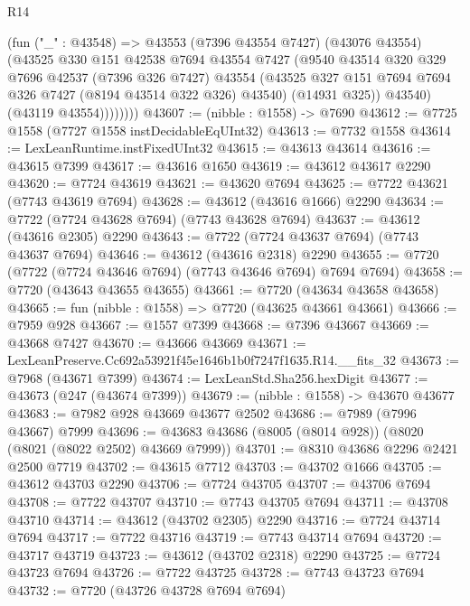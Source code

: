 \begin{lexlean}{R14}
\begin{coremodule}
                (fun ("_" : @43548) =>
                @43553
                  (@7396 @43554 @7427)
                  (@43076 @43554)
                  (@43525
                    @330
                    @151
                    @42538
                    @7694
                    @43554
                    @7427
                    (@9540
                      @43514
                      @320
                      @329
                      @7696
                      @42537
                      (@7396 @326 @7427)
                      @43554
                      (@43525 @327 @151 @7694 @7694 @326 @7427 (@8194 @43514 @322 @326) @43540)
                      (@14931 @325))
                    @43540)
                  (@43119 @43554))))))))
@43607 := (nibble : @1558) -> @7690
@43612 := @7725 @1558 (@7727 @1558 instDecidableEqUInt32)
@43613 := @7732 @1558
@43614 := LexLeanRuntime.instFixedUInt32
@43615 := @43613 @43614
@43616 := @43615 @7399
@43617 := @43616 @1650
@43619 := @43612 @43617 @2290
@43620 := @7724 @43619
@43621 := @43620 @7694
@43625 := @7722 @43621 (@7743 @43619 @7694)
@43628 := @43612 (@43616 @1666) @2290
@43634 := @7722 (@7724 @43628 @7694) (@7743 @43628 @7694)
@43637 := @43612 (@43616 @2305) @2290
@43643 := @7722 (@7724 @43637 @7694) (@7743 @43637 @7694)
@43646 := @43612 (@43616 @2318) @2290
@43655 := @7720 (@7722 (@7724 @43646 @7694) (@7743 @43646 @7694) @7694 @7694)
@43658 := @7720 (@43643 @43655 @43655)
@43661 := @7720 (@43634 @43658 @43658)
@43665 := fun (nibble : @1558) => @7720 (@43625 @43661 @43661)
@43666 := @7959 @928
@43667 := @1557 @7399
@43668 := @7396 @43667
@43669 := @43668 @7427
@43670 := @43666 @43669
@43671 := LexLeanPreserve.Cc692a53921f45e1646b1b0f7247f1635.R14.__fits_32
@43673 := @7968 (@43671 @7399)
@43674 := LexLeanStd.Sha256.hexDigit
@43677 := @43673 (@247 (@43674 @7399))
@43679 := (nibble : @1558) -> @43670 @43677
@43683 := @7982 @928 @43669 @43677 @2502
@43686 := @7989 (@7996 @43667) @7999
@43696 := @43683 @43686 (@8005 (@8014 @928)) (@8020 (@8021 (@8022 @2502) @43669 @7999))
@43701 := @8310 @43686 @2296 @2421 @2500 @7719
@43702 := @43615 @7712
@43703 := @43702 @1666
@43705 := @43612 @43703 @2290
@43706 := @7724 @43705
@43707 := @43706 @7694
@43708 := @7722 @43707
@43710 := @7743 @43705 @7694
@43711 := @43708 @43710
@43714 := @43612 (@43702 @2305) @2290
@43716 := @7724 @43714 @7694
@43717 := @7722 @43716
@43719 := @7743 @43714 @7694
@43720 := @43717 @43719
@43723 := @43612 (@43702 @2318) @2290
@43725 := @7724 @43723 @7694
@43726 := @7722 @43725
@43728 := @7743 @43723 @7694
@43732 := @7720 (@43726 @43728 @7694 @7694)

\end{coremodule}
\end{lexlean}
